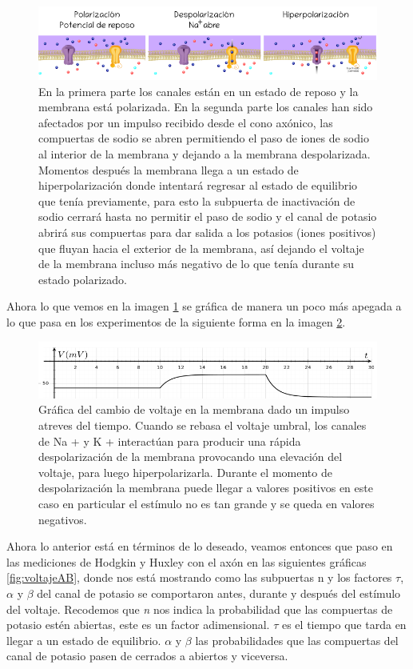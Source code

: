 \begin{figure}[h]
 \centering
 \includegraphics[scale=0.5]{../Figuras/polarizacion1.png}
 \caption{En la primera parte los canales están en un estado de reposo y la membrana está polarizada. En la segunda parte los canales han sido afectados por un impulso recibido desde el cono axónico, las compuertas de sodio se abren permitiendo el paso de iones de sodio al interior de la membrana y dejando a la membrana despolarizada. Momentos después la membrana llega a un estado de hiperpolarización donde intentará regresar al estado de equilibrio que tenía previamente, para esto la subpuerta de inactivación de sodio cerrará hasta no permitir el paso de sodio y el canal de potasio abrirá sus compuertas para dar salida a los potasios (iones positivos) que fluyan hacia el exterior de la membrana, así dejando el voltaje de la membrana incluso más negativo de lo que tenía durante su estado polarizado. }
 \label{fig:voltaje1}
\end{figure}

Ahora lo que vemos en la imagen \ref{fig:voltaje1} se gráfica de manera un poco más apegada a lo que pasa en los experimentos de la siguiente forma en la imagen \ref{fig:voltaje2}.

\begin{figure}[h]
 \centering
 \includegraphics[scale=0.5]{../Figuras/polarizacion2.png}
 \caption{Gráfica del cambio de voltaje en la membrana dado un impulso atreves del tiempo. Cuando se rebasa el voltaje umbral, los canales de Na + y K + interactúan para producir una rápida despolarización de la membrana provocando una elevación del voltaje, para luego hiperpolarizarla. Durante el momento de despolarización la membrana puede llegar a valores positivos en este caso en particular el estímulo no es tan grande y se queda en valores negativos.}
 \label{fig:voltaje2}
\end{figure}


Ahora lo anterior está en términos de lo deseado, veamos entonces que paso en las mediciones de Hodgkin y Huxley con el axón en las siguientes gráficas \ref{fig:voltajeAB}, donde nos está mostrando como las subpuertas n y los factores \(\tau\), \(\alpha\) y \(\beta\) del canal de potasio se comportaron antes, durante y después del estímulo del voltaje. Recodemos que \emph{n} nos indica la probabilidad que las compuertas de potasio estén abiertas, este es un factor adimensional. \(\tau\) es el tiempo que tarda en llegar a un estado de equilibrio. \(\alpha\) y \(\beta\) las probabilidades que las compuertas del canal de potasio pasen de cerrados a abiertos y viceversa. 


